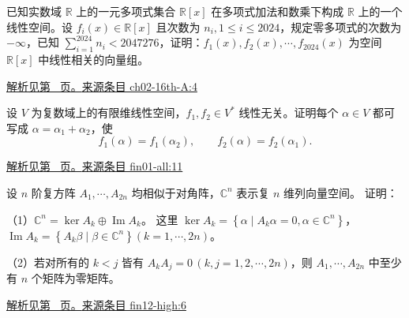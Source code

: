 \documentclass[12pt,fontset=fandol]{ctexart}
\begin{document}
\begin{example}\label{ex:ch02-16th-A:4}

已知实数域 $\mathbb{R}$ 上的一元多项式集合 $\mathbb{R}[x]$ 在多项式加法和数乘下构成 $\mathbb{R}$ 上的一个线性空间。设 $f_{i}(x) \in \mathbb{R}[x]$ 且次数为 $n_{i}, 1 \leq i \leq 2024$，规定零多项式的次数为 $-\infty$，已知 $\sum_{i=1}^{2024} n_{i} < 2047276$，证明：$f_{1}(x), f_{2}(x), \cdots, f_{2024}(x)$ 为空间 $\mathbb{R}[x]$ 中线性相关的向量组。

\par\hyperref[ans:ch02-16th-A:4]{解析见第~\pageref{ans:ch02-16th-A:4} 页。}\quad\href{https://github.com/lzxcr/cmc-mathematics/blob/64916fa1fdbc3e444a652eca204d5669058ee321/src/problems/preliminary/16/04.md}{来源条目 ch02-16th-A:4}

\end{example}

\begin{example}\label{ex:fin01-all:11}

设 $V$ 为复数域上的有限维线性空间，$f_1,f_2\in V^*$ 线性无关。证明每个 $\alpha\in V$ 都可写成 $\alpha=\alpha_1+\alpha_2$，使
\[
f_1(\alpha)=f_1(\alpha_2),\qquad f_2(\alpha)=f_2(\alpha_1).
\]

\par\hyperref[ans:fin01-all:11]{解析见第~\pageref{ans:fin01-all:11} 页。}\quad\href{https://github.com/lzxcr/cmc-mathematics/blob/64916fa1fdbc3e444a652eca204d5669058ee321/src/problems/finals/01/11.md}{来源条目 fin01-all:11}

\end{example}

\begin{example}\label{ex:fin12-high:6}

设 $n$ 阶复方阵 $A_{1},\cdots,A_{2n}$ 均相似于对角阵，$\mathbb{C}^{n}$ 表示复 $n$ 维列向量空间。 证明：

（1）$\mathbb{C}^{n}=\ker A_{k}\oplus\operatorname{Im} A_{k}$。 这里
$\ker A_{k}=\left\{\alpha\mid A_{k}\alpha=0,\alpha\in\mathbb{C}^{n}\right\}$，
$\operatorname{Im} A_{k}=\left\{A_{k}\beta\mid\beta\in\mathbb{C}^{n}\right\}(k=1,\cdots,2n)$。

（2）若对所有的 $k<j$ 皆有 $A_{k}A_{j}=0\,(k,j=1,2,\cdots,2n)$，则 $A_{1},\cdots,A_{2n}$ 中至少有 $n$ 个矩阵为零矩阵。

\par\hyperref[ans:fin12-high:6]{解析见第~\pageref{ans:fin12-high:6} 页。}\quad\href{https://github.com/lzxcr/cmc-mathematics/blob/64916fa1fdbc3e444a652eca204d5669058ee321/src/problems/finals/12/06.md}{来源条目 fin12-high:6}

\end{example}
\end{document}
